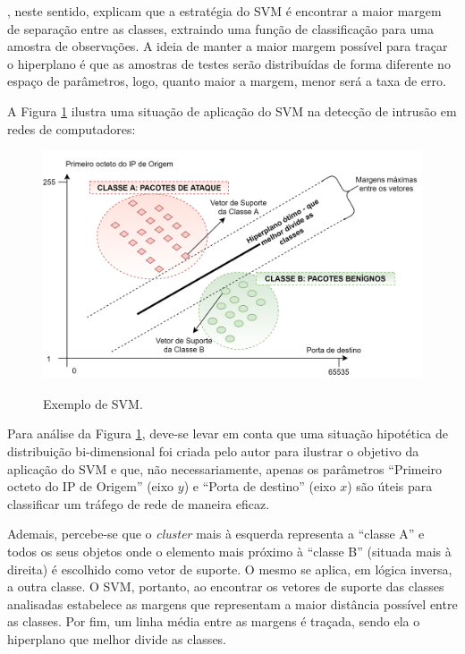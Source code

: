 , neste sentido, explicam que a estratégia do SVM é encontrar a maior margem de separação entre as classes, extraindo uma função de classificação para uma amostra de observações. A ideia de manter a maior margem possível para traçar o hiperplano é que as amostras de testes serão distribuídas de forma diferente no espaço de parâmetros, logo, quanto maior a margem, menor será a taxa de erro.

A Figura \ref{fig:svm} ilustra uma situação de aplicação do SVM na detecção de intrusão em redes de computadores:

\begin{figure}[H]
\centering
\caption{Exemplo de SVM.}
\includegraphics[width=\textwidth,keepaspectratio]{figs/svm.png}
\newline {}\label{fig:svm}
\end{figure}

Para análise da Figura \ref{fig:svm}, deve-se levar em conta que uma situação hipotética de distribuição bi-dimensional foi criada pelo autor para ilustrar o objetivo da aplicação do SVM e que, não necessariamente, apenas os parâmetros ``Primeiro octeto do IP de Origem'' (eixo $y$) e ``Porta de destino'' (eixo $x$) são úteis para classificar um tráfego de rede de maneira eficaz. 

Ademais, percebe-se que o \textit{cluster} mais à esquerda representa a ``classe A'' e todos os seus objetos onde o elemento mais próximo à ``classe B'' (situada mais à direita) é escolhido como vetor de suporte. O mesmo se aplica, em lógica inversa, a outra classe. O SVM, portanto, ao encontrar os vetores de suporte das classes analisadas estabelece as margens que representam a maior distância possível entre as classes. Por fim, um linha média entre as margens é traçada, sendo ela o hiperplano que melhor divide as classes. 



